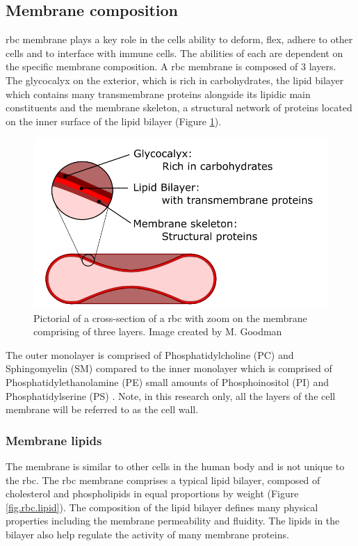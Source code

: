 \subsection{Membrane composition}
\noindent \ac{rbc} membrane plays a key role in the cells ability to deform, flex, adhere to other cells and to interface with immune cells. The abilities of each are dependent on the specific membrane composition. A \ac{rbc} membrane is composed of 3 layers. The glycocalyx on the exterior, which is rich in carbohydrates, the lipid bilayer which contains many transmembrane proteins alongside its lipidic main constituents and the membrane skeleton, a structural network of proteins located on the inner surface of the lipid bilayer \cite{redblood2009, Shape2010} (Figure \ref{fig.rbc.wall}). 

\begin{figure}[H]
	\centering
	
	\includegraphics[width=0.5\linewidth]{fig/rbc}
	
	\caption{Pictorial of a cross-section of a \ac{rbc} with zoom on the membrane comprising of three layers. Image created by M. Goodman  }
	\label{fig.rbc.wall}
\end{figure}

\noindent The outer monolayer is comprised of Phosphatidylcholine (PC) and Sphingomyelin (SM) compared to the inner monolayer which is comprised of Phosphatidylethanolamine (PE) small amounts of Phosphoinositol (PI) and Phosphatidylserine (PS) \cite{Quinn2002}. Note, in this research only, all the layers of the cell membrane will be referred to as the cell wall.


\subsubsection*{Membrane lipids}
\noindent The membrane is similar to other cells in the human body and is not unique to the \ac{rbc}. The \ac{rbc} membrane comprises a typical lipid bilayer, composed of cholesterol and phospholipids in equal proportions by weight \cite{redblood2009} (Figure \ref{fig.rbc.lipid}). The composition of the lipid bilayer defines many physical properties including the membrane permeability and fluidity. The lipids in the bilayer also help regulate the activity of many membrane proteins.


